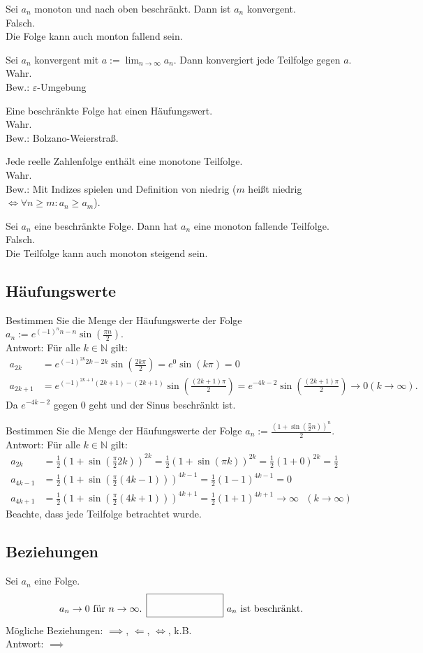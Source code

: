Sei $a_n$ monoton und nach oben beschränkt.
Dann ist $a_n$ konvergent.\\
Falsch.\\
Die Folge kann auch monton fallend sein.

Sei $a_n$ konvergent mit $a := \lim_{n \to \infty} a_n$.
Dann konvergiert jede Teilfolge gegen $a$.\\
Wahr.\\
Bew.: $\varepsilon$-Umgebung

Eine beschränkte Folge hat einen Häufungswert.\\
Wahr.\\
Bew.: Bolzano-Weierstraß.

Jede reelle Zahlenfolge enthält eine monotone Teilfolge.\\
Wahr.\\
Bew.: Mit Indizes spielen und Definition von niedrig ($m$ heißt niedrig $\iff \forall n \geq m : a_n \geq a_m$).

Sei $a_n$ eine beschränkte Folge.
Dann hat $a_n$ eine monoton fallende Teilfolge.\\
Falsch.\\
Die Teilfolge kann auch monoton steigend sein.

\subsection{Häufungswerte}
Bestimmen Sie die Menge der Häufungswerte der Folge $a_n := e^{(-1)^{n}n-n} \sin\left(\frac{\pi n}{2}\right)$.\\
Antwort:
Für alle $k \in \mathbb{N}$ gilt:
\begin{align*}
  a_{2k} &= e^{(-1)^{2k}2k-2k}\sin\left(\frac{2k\pi}{2}\right) = e^0 \sin(k\pi) = 0\\
  a_{2k+1} &= e^{(-1)^{2k+1}(2k+1)-(2k+1)}\sin\left(\frac{(2k+1)\pi}{2}\right) = e^{-4k-2} \sin\left(\frac{(2k+1)\pi}{2}\right) \to 0 (k \to \infty).
\end{align*}
Da $e^{-4k-2}$ gegen $0$ geht und der Sinus beschränkt ist.

Bestimmen Sie die Menge der Häufungswerte der Folge $a_n := \frac{\left(1+\sin\left(\frac{\pi}{2}n\right)\right)^n}{2}$.\\
Antwort: Für alle $k \in \mathbb{N}$ gilt:
\begin{align*}
  a_{2k} &= \frac{1}{2} \left(1+\sin\left(\frac{\pi}{2}2k\right)\right)^{2k} = \frac{1}{2} \left(1+\sin\left(\pi k\right)\right)^{2k} = \frac{1}{2} (1 + 0)^{2k} = \frac{1}{2}\\
  a_{4k-1} &= \frac{1}{2} \left(1+\sin\left(\frac{\pi}{2}(4k-1)\right)\right)^{4k-1} = \frac{1}{2} (1 - 1)^{4k-1} = 0\\
  a_{4k+1} &= \frac{1}{2} \left(1+\sin\left(\frac{\pi}{2}(4k+1)\right)\right)^{4k+1} = \frac{1}{2} (1 + 1)^{4k+1} \to \infty \text{ } (k \to \infty) 
\end{align*}
Beachte, dass jede Teilfolge betrachtet wurde.

\subsection{Beziehungen}
Sei $a_n$ eine Folge.
\begin{displaymath}
  a_n \to 0 \text{ für } n \to \infty \text{. } \fbox{\rule{1in}{0pt}\rule[-0.5ex]{0pt}{4ex}} \text{ $a_n$ ist beschränkt.}
\end{displaymath}
Mögliche Beziehungen:
$\implies$, $\Leftarrow$, $\iff$, k.B.\\
Antwort: $\implies$